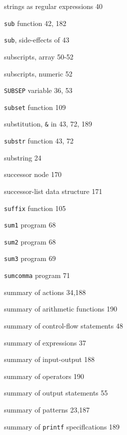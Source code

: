 \begin{multicols}{3}
\hangindent=3pc  strings as regular expressions 40

\hangindent=3pc  \verb'sub' function 42, 182

\hangindent=3pc  \verb'sub', side-effects of 43

\hangindent=3pc  subscripts, array 50-52

\hangindent=3pc  subscripts, numeric 52

\hangindent=3pc  \verb'SUBSEP' variable 36, 53

\hangindent=3pc  \verb'subset' function 109

\hangindent=3pc  substitution, \verb'&' in 43, 72, 189

\hangindent=3pc  \verb'substr' function 43, 72

\hangindent=3pc  substring 24

\hangindent=3pc  successor node 170

\hangindent=3pc  successor-list data structure 171

\hangindent=3pc  \verb'suffix' function 105







\hangindent=3pc  \verb'sum1' program 68

\hangindent=3pc  \verb'sum2' program 68

\hangindent=3pc  \verb'sum3' program 69

\hangindent=3pc  \verb'sumcomma' program 71

\hangindent=3pc  summary of actions 34,188

\hangindent=3pc  summary of arithmetic functions 190

\hangindent=3pc  summary of control-flow statements 48

\hangindent=3pc  summary of expressions 37

\hangindent=3pc  summary of input-output 188

\hangindent=3pc  summary of operators 190

\hangindent=3pc  summary of output statements 55

\hangindent=3pc  summary of patterns 23,187

\hangindent=3pc  summary of \verb'printf' speciflcations 189


\end{multicols}
